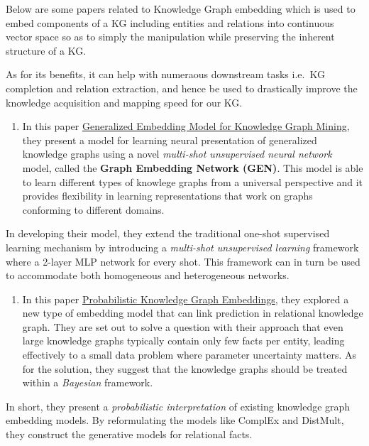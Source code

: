 \documentclass[]{book}
\providecommand{\tightlist}{%
  \setlength{\itemsep}{0pt}\setlength{\parskip}{0pt}}
\theoremstyle{definition}
\theoremstyle{definition}
\theoremstyle{definition}
\theoremstyle{remark}
\begin{document}
Below are some papers related to Knowledge Graph embedding which is used
to embed components of a KG including entities and relations into
continuous vector space so as to simply the manipulation while
preserving the inherent structure of a KG.

As for its benefits, it can help with numeraous downstream tasks i.e.~KG
completion and relation extraction, and hence be used to drastically
improve the knowledge acquisition and mapping speed for our KG.

\begin{enumerate}
\def\labelenumi{\arabic{enumi}.}
\setcounter{enumi}{1}
\tightlist
\item
  In this paper
  \href{http://www.mlgworkshop.org/2018/papers/MLG2018_paper_5.pdf}{Generalized
  Embedding Model for Knowledge Graph Mining}, they present a model for
  learning neural presentation of generalized knowledge graphs using a
  novel \emph{multi-shot unsupervised neural network} model, called the
  \textbf{Graph Embedding Network (GEN)}. This model is able to learn
  different types of knowlege graphs from a universal perspective and it
  provides flexibility in learning representations that work on graphs
  conforming to different domains.
\end{enumerate}

In developing their model, they extend the traditional one-shot
supervised learning mechanism by introducing a \emph{multi-shot
unsupervised learning} framework where a 2-layer MLP network for every
shot. This framework can in turn be used to accommodate both homogeneous
and heterogeneous networks.

\begin{enumerate}
\def\labelenumi{\arabic{enumi}.}
\setcounter{enumi}{2}
\tightlist
\item
  In this paper
  \href{https://openreview.net/pdf?id=rJ4qXnCqFX}{Probabilistic
  Knowledge Graph Embeddings}, they explored a new type of embedding
  model that can link prediction in relational knowledge graph. They are
  set out to solve a question with their approach that even large
  knowledge graphs typically contain only few facts per entity, leading
  effectively to a small data problem where parameter uncertainty
  matters. As for the solution, they suggest that the knowledge graphs
  should be treated within a \emph{Bayesian} framework.
\end{enumerate}

In short, they present a \emph{probabilistic interpretation} of existing
knowledge graph embedding models. By reformulating the models like
ComplEx and DistMult, they construct the generative models for
relational facts.
\end{document}
